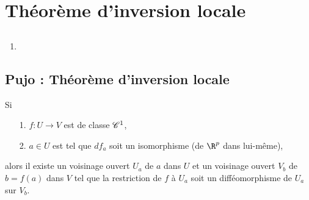 \documentclass[12pt, class=report,crop=false]{standalone}
\begin{document}
\section{Théorème d'inversion locale}

\subsection{}


\subsection{}


\subsection{}


\subsection{}
 
 
\begin{miniexercices}
\sauteligne
\begin{enumerate}
  \item 
\end{enumerate}
\end{miniexercices}


\subsection{Pujo : Th\'eor\`eme d'inversion locale}
\begin{theoreme}
\textcolor[rgb]{0.44,0.00,0.87}{
Si
\begin{itemize}
  \item[1.]$f: U \rightarrow V$ est de classe $\mathscr{C}^1$,
  \item[2.]$a \in U$ est tel que $df_a$ soit un isomorphisme (de $\R^p$ dans lui-même),
  \end{itemize}
alors il existe un voisinage ouvert $U_a$ de $a$ dans $U$ et un voisinage ouvert
$V_b$ de $b=f(a)$ dans $V$ tel que la restriction de $f$ \`a $U_a$ soit un diff\'eomorphisme de $U_a$
sur $V_b$.}
\end{theoreme}
\end{document}
